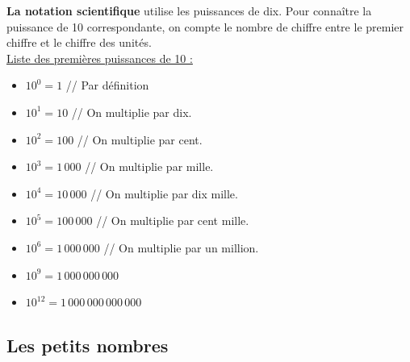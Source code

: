 \documentclass[12pt]{article}
\begin{document}
\begin{multicols}{2}
  \textbf{La notation scientifique} utilise les puissances de dix. Pour connaître la puissance de 10 correspondante, on compte le nombre de chiffre entre le premier chiffre et le chiffre des unités. \\ 

  \underline{Liste des premières puissances de 10 :} \\

  \begin{itemize}
  \item $10^0 = 1 $ // Par définition 
  \item $10^1 = 10$ // On multiplie par dix.
  \item $10^2 = 100$ // On multiplie par cent.
  \item $10^3 = 1 \, 000$ // On multiplie par mille.
  \item $10^4 = 10 \, 000$ // On multiplie par dix mille.
  \item $10^5 = 100 \, 000$ // On multiplie par cent mille.
  \item $10^6 = 1 \, 000\, 000$ // On multiplie par un million.
  \item $10^9 = 1 \, 000\, 000 \, 000$ 
  \item $10^{12} =1 \, 000 \, 000 \, 000 \, 000$
  \end{itemize}

\end{multicols}

\subsection*{Les petits nombres}
\end{document}
